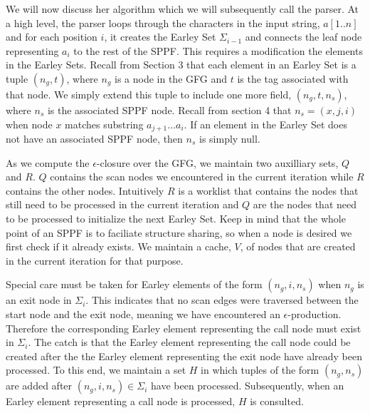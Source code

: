 \documentclass{sigplanconf}
\begin{document}
We will now discuss her algorithm which we will subsequently call the parser. At a high level, the parser loops through the characters in the input string, $a[1..n]$ and for each position $i$, it creates the Earley Set $\Sigma_{i-1}$ and connects the leaf node representing $a_i$ to the rest of the SPPF. This requires a modification the elements in the Earley Sets. Recall from Section 3 that each element in an Earley Set is a tuple $(n_g, t)$, where $n_g$ is a node in the GFG and $t$ is the tag associated with that node. We simply extend this tuple to include one more field, $(n_g, t, n_s)$, where $n_s$ is the associated SPPF node. Recall from section 4 that $n_s = (x,j,i)$ when node $x$ matches substring $a_{j+1}\dots{a_i}$. If an element in the Earley Set does not have an associated SPPF node, then $n_s$ is simply null.

As we compute the $\epsilon$-closure over the GFG, we maintain two auxilliary sets, $Q$ and $R$. $Q$ contains the scan nodes we encountered in the current iteration while $R$ contains the other nodes. Intuitively $R$ is a worklist that contains the nodes that still need to be processed in the current iteration and $Q$ are the nodes that need to be processed to initialize the next Earley Set. Keep in mind that the whole point of an SPPF is to faciliate structure sharing, so when a node is desired we first check if it already exists. We maintain a cache, $V$, of nodes that are created in the current iteration for that purpose.

Special care must be taken for Earley elements of the form $(n_g,i,n_s)$ when $n_g$ is an exit node in $\Sigma_i$. This indicates that no scan edges were traversed between the start node and the exit node, meaning we have encountered an $\epsilon$-production. Therefore the corresponding Earley element representing the call node must exist in $\Sigma_i$. The catch is that the Earley element representing the call node could be created after the the Earley element representing the exit node have already been processed. To this end, we maintain a set $H$ in which tuples of the form $(n_g,n_s)$ are added after $(n_g,i,n_s)\in{\Sigma_i}$ have been processed. Subsequently, when an Earley element representing a call node is processed, $H$ is consulted. 
\end{document}
